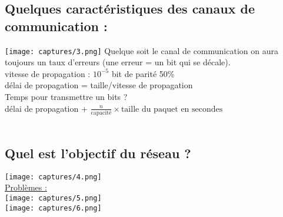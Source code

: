 \documentclass{article}
\begin{document}
    \subsection*{Quelques caractéristiques des canaux de communication : } 
    \texttt{[image: captures/3.png]}
    Quelque soit le canal de communication on aura toujours un taux d'erreurs (une erreur = un bit qui se décale). \\
    vitesse de propagation : $10^{-5}$ bit de parité 50\%\\
    délai de propagation = taille/vitesse de propagation \\
    Temps pour transmettre un bits ? \\
    délai de propagation + $\frac{n}{\text{capacité}} \times \text{taille du paquet en secondes}$ \\
    \\
    \subsection*{Quel est l'objectif du réseau ? } 
    \texttt{[image: captures/4.png]} \\
    \underline{Problèmes : } \\
    \texttt{[image: captures/5.png]} \\
    \texttt{[image: captures/6.png]} \\
    \\
    \newpage
\end{document}
